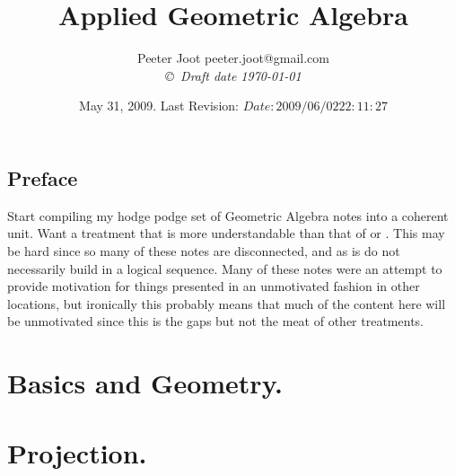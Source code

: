 \documentclass[12pt,leqno]{book}
\title{Applied Geometric Algebra}
\author{Peeter Joot  \quad peeter.joot@gmail.com \\
{\small\em \copyright \  Draft date \today }}
\date{ May 31, 2009.  Last Revision: $Date: 2009/06/02 22:11:27 $ }
\begin{document}
\maketitle
\tableofcontents
\listoffigures
\listoftables
\chapter*{Preface}\normalsize
\pagestyle{plain}

Start compiling my hodge podge set of Geometric Algebra notes into a coherent unit.  Want a treatment that is more
understandable than that of 
\cite{doran2003gap} or 
\cite{hestenes1999nfc}.
This may be hard since so many of these notes are disconnected, and as
is do not necessarily build in a logical sequence.  Many of these 
notes were an attempt to provide motivation for things presented in
an unmotivated fashion in other locations, but ironically this probably
means that much of the content here will be unmotivated since this 
is the gaps but not the meat of other treatments.


\pagestyle{headings}


\part{Basics and Geometry.}















\part{Projection.}






\end{document}
